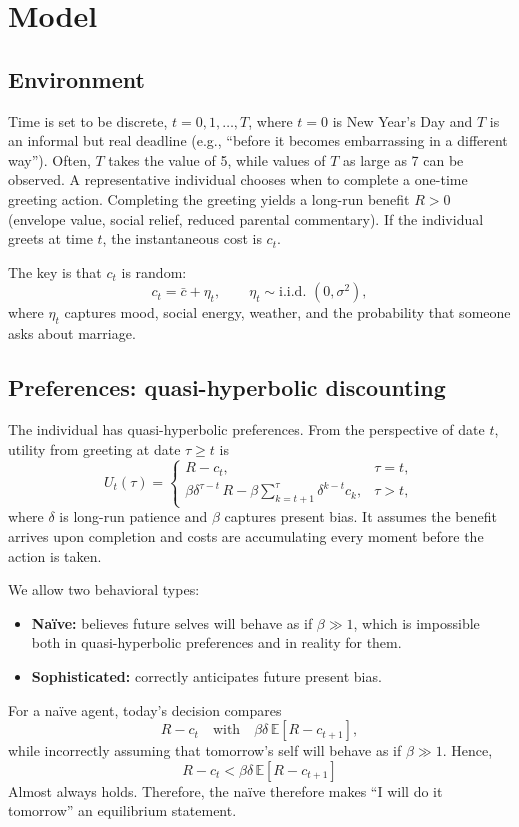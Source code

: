 \documentclass[AER]{AEA}
\newcommand{\E}{\mathbb{E}}
\begin{document}
\section{Model}

\subsection{Environment}
Time is set to be discrete, $t=0,1,\dots,T$, where $t=0$ is New Year's Day and $T$ is an informal but real deadline (e.g., ``before it becomes embarrassing in a different way''). Often, $T$ takes the value of 5, while values of $T$ as large as 7 can be observed. A representative individual chooses when to complete a one-time greeting action. Completing the greeting yields a long-run benefit $R>0$ (envelope value, social relief, reduced parental commentary). If the individual greets at time $t$, the instantaneous cost is $c_t$.

The key is that $c_t$ is random:
\begin{equation}
c_t = \bar c + \eta_t,\qquad \eta_t \sim \text{i.i.d. } (0,\sigma^2),
\end{equation}
where $\eta_t$ captures mood, social energy, weather, and the probability that someone asks about marriage.

\subsection{Preferences: quasi-hyperbolic discounting}
The individual has quasi-hyperbolic preferences. From the perspective of date $t$, utility from greeting at date $\tau\ge t$ is
\begin{equation}
U_t(\tau)=
\begin{cases}
R - c_t, & \tau=t,\\[4pt]
\beta \delta^{\tau-t}\, R - \beta \sum_{k=t+1}^{\tau}\delta^{k-t} c_k, & \tau>t,
\end{cases}
\label{eq:qhd}
\end{equation}
where $\delta$ is long-run patience and $\beta$ captures present bias. It assumes the benefit arrives upon completion and costs are accumulating every moment before the action is taken.

We allow two behavioral types:
\begin{itemize}
\item \textbf{Na\"ive:} believes future selves will behave as if $\beta\gg1$, which is impossible both in quasi-hyperbolic preferences and in reality for them.
\item \textbf{Sophisticated:} correctly anticipates future present bias.
\end{itemize}
For a na\"ive agent, today's decision compares
\[
R-c_t \quad \text{with} \quad \beta\delta\,\E[R-c_{t+1}],
\]
while incorrectly assuming that tomorrow's self will behave as if $\beta\gg1$. Hence,
\[
R-c_t < \beta\delta\,\E[R-c_{t+1}]
\]
Almost always holds. Therefore, the na\"ive therefore makes ``I will do it tomorrow'' an equilibrium statement.
\end{document}

